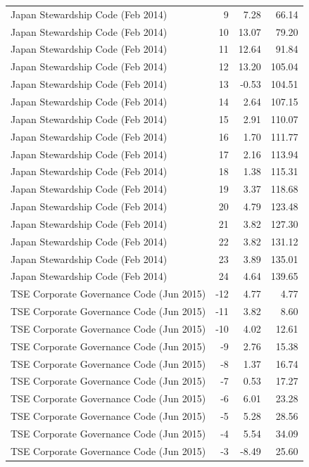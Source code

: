 \begin{table}
\begin{tabular}{lrrr}
Japan Stewardship Code (Feb 2014) & 9 & 7.28 & 66.14 \\
Japan Stewardship Code (Feb 2014) & 10 & 13.07 & 79.20 \\
Japan Stewardship Code (Feb 2014) & 11 & 12.64 & 91.84 \\
Japan Stewardship Code (Feb 2014) & 12 & 13.20 & 105.04 \\
Japan Stewardship Code (Feb 2014) & 13 & -0.53 & 104.51 \\
Japan Stewardship Code (Feb 2014) & 14 & 2.64 & 107.15 \\
Japan Stewardship Code (Feb 2014) & 15 & 2.91 & 110.07 \\
Japan Stewardship Code (Feb 2014) & 16 & 1.70 & 111.77 \\
Japan Stewardship Code (Feb 2014) & 17 & 2.16 & 113.94 \\
Japan Stewardship Code (Feb 2014) & 18 & 1.38 & 115.31 \\
Japan Stewardship Code (Feb 2014) & 19 & 3.37 & 118.68 \\
Japan Stewardship Code (Feb 2014) & 20 & 4.79 & 123.48 \\
Japan Stewardship Code (Feb 2014) & 21 & 3.82 & 127.30 \\
Japan Stewardship Code (Feb 2014) & 22 & 3.82 & 131.12 \\
Japan Stewardship Code (Feb 2014) & 23 & 3.89 & 135.01 \\
Japan Stewardship Code (Feb 2014) & 24 & 4.64 & 139.65 \\
TSE Corporate Governance Code (Jun 2015) & -12 & 4.77 & 4.77 \\
TSE Corporate Governance Code (Jun 2015) & -11 & 3.82 & 8.60 \\
TSE Corporate Governance Code (Jun 2015) & -10 & 4.02 & 12.61 \\
TSE Corporate Governance Code (Jun 2015) & -9 & 2.76 & 15.38 \\
TSE Corporate Governance Code (Jun 2015) & -8 & 1.37 & 16.74 \\
TSE Corporate Governance Code (Jun 2015) & -7 & 0.53 & 17.27 \\
TSE Corporate Governance Code (Jun 2015) & -6 & 6.01 & 23.28 \\
TSE Corporate Governance Code (Jun 2015) & -5 & 5.28 & 28.56 \\
TSE Corporate Governance Code (Jun 2015) & -4 & 5.54 & 34.09 \\
TSE Corporate Governance Code (Jun 2015) & -3 & -8.49 & 25.60 \\

\end{tabular}
\end{table}
